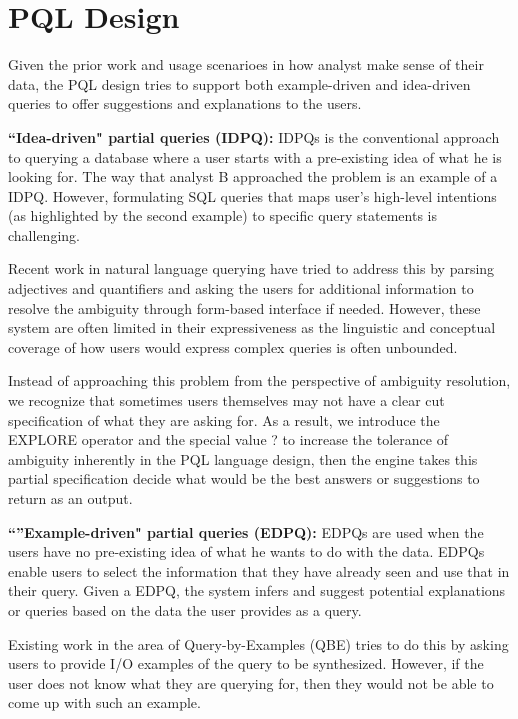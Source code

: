 \documentclass{sig-alternate-05-2015}
\begin{document}
\section{PQL Design}
Given the prior work and usage scenarioes in how analyst make sense of their data, the PQL design tries to support both example-driven and idea-driven queries to offer suggestions and explanations to the users. %
\par \textbf{``Idea-driven" partial queries (IDPQ):} IDPQs is the conventional approach to querying a database where a user starts with a pre-existing idea of what he is looking for. The way that analyst B approached the problem is an example of a IDPQ. %
However, formulating SQL queries that maps user's high-level intentions (as highlighted by the second example) to specific query statements is challenging. 
\par Recent work in natural language querying have tried to address this by parsing adjectives and quantifiers and asking the users for additional information to resolve the ambiguity through form-based interface if needed. However, these system are often limited in their expressiveness as the linguistic and conceptual coverage of how users would express complex queries is often unbounded. 
\par Instead of approaching this problem from the perspective of ambiguity resolution, we recognize that sometimes users themselves may not have a clear cut specification of what they are asking for. As a result, we introduce the EXPLORE operator and the special value ? to increase the tolerance of ambiguity inherently in the PQL language design, then the engine takes this partial specification decide what would be the best answers or suggestions to return as an output.
\par \textbf{``''Example-driven" partial queries (EDPQ):} EDPQs are used when the users have no pre-existing idea of what he wants to do with the data. EDPQs enable users to select the information that they have already seen and use that in their query. Given a EDPQ, the system infers and suggest potential explanations or queries based on the data the user provides as a query.
\par Existing work in the area of Query-by-Examples (QBE) tries to do this by asking users to provide I/O examples of the query to be synthesized. However, if the user does not know what they are querying for, then they would not be able to come up with such an example.
\end{document}

